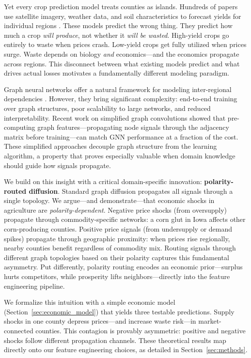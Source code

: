 \documentclass[preprint,12pt,authoryear]{elsarticle}
\begin{document}
Yet every crop prediction model treats counties as islands. Hundreds of papers use satellite imagery, weather data, and soil characteristics to forecast yields for individual regions \citep{vanklompenburg2020crop,kang2020comparative,basso2019seasonal,lobell2011climate}. These models predict the wrong thing. They predict how much a crop \emph{will produce}, not whether it \emph{will be wasted}. High-yield crops go entirely to waste when prices crash. Low-yield crops get fully utilized when prices surge. Waste depends on biology \emph{and} economics---and the economics propagate across regions. This disconnect between what existing models predict and what drives actual losses motivates a fundamentally different modeling paradigm.

Graph neural networks offer a natural framework for modeling inter-regional dependencies \citep{kipf2017gcn,velickovic2018gat}. However, they bring significant complexity: end-to-end training over graph structures, poor scalability to large networks, and reduced interpretability. Recent work on simplified graph convolutions \citep{wu2019sgc,rossi2020sign} showed that pre-computing graph features---propagating node signals through the adjacency matrix before training---can match GNN performance at a fraction of the cost. These simplified approaches decouple graph structure from the learning algorithm, a property that proves especially valuable when domain knowledge should guide how signals propagate.

We build on this insight with a critical domain-specific innovation: \textbf{polarity-routed diffusion}. Standard graph diffusion propagates all signals through a single topology. We argue---and demonstrate---that economic shocks in agriculture are \emph{polarity-dependent}. Negative price shocks (from oversupply) propagate through commodity-specific networks: a corn glut in Iowa affects other corn-producing counties. Positive price signals (from undersupply or demand spikes) propagate through geographic proximity: when prices rise regionally, nearby counties benefit regardless of commodity mix. Routing signals through different graph topologies based on their polarity captures this fundamental asymmetry. Put differently, polarity routing encodes an economic prior---surplus hurts competitors, while prosperity lifts neighbors---directly into the feature engineering pipeline.

We formalize this intuition with a simple economic model (Section~\ref{sec:economic_model}) that yields three testable predictions. Supply shocks in one county depress prices---and increase waste risk---in market-connected counties. This contagion is provably asymmetric: positive and negative shocks follow different propagation channels. These theoretical results map directly onto our feature engineering choices, as detailed in Section~\ref{sec:methods}.
\end{document}
